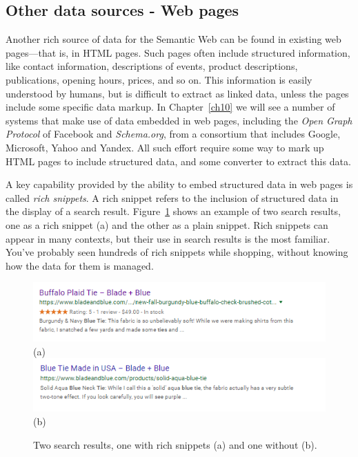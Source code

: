 \subsection{Other data sources - Web pages}
\label{webembed}

Another rich
source of data for the Semantic Web can be found in existing web
pages---that is, in HTML pages. Such pages often include structured
information, like contact information, descriptions of events, product
descriptions, publications, opening hours, prices, and so on. This information is 
easily understood by humans, but is difficult to extract as linked
data, unless the pages include some specific data markup.   In Chapter~\ref{ch10} 
we will see a number of systems that make use of data embedded in web pages, including 
the \emph{Open Graph Protocol} of Facebook and \emph{Schema.org}, from a consortium that
includes Google, Microsoft, Yahoo and Yandex.   All such effort require some way to
mark up HTML pages to include structured data, and some converter to extract this data. 

A key capability provided by the ability to embed structured data in web pages is 
called \emph{rich snippets}.  A rich snippet refers to the inclusion of structured
data in the display of a search result.  Figure~\ref{fig:ch4.RS} shows an example of two 
search results, one as a rich snippet (a) and the other as a plain snippet.  Rich snippets
can appear in many contexts, but their use in search results is the most familiar. 
You've probably seen hundreds of rich snippets while shopping, without knowing how
the data for them is managed. 

\begin{figure}
    \centering
    \includegraphics{SWWOv3/media/ch4/WithRichSnippet.png}
    (a)
    \includegraphics{SWWOv3/media/ch4/WithoutRichSnippet.png}
    (b)
    \caption{Two search results, one with rich snippets (a) and one without (b). }
    \label{fig:ch4.RS}
\end{figure}

